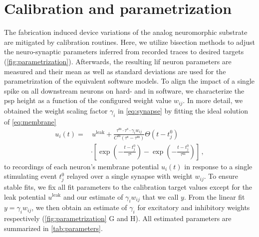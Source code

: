 \section{Calibration and parametrization \label{sec:parametrization}}

The fabrication induced device variations of the analog neuromorphic substrate are mitigated by calibration routines.
Here, we utilize bisection methods to adjust the neuro-synaptic parameters inferred from recorded traces to desired targets (\cref{fig:parametrization}).
Afterwards, the resulting \gls{lif} neuron parameters are measured and their mean as well as standard deviations are used for the parametrization of the equivalent software models.
To align the impact of a single spike on all downstream neurons on hard- and in software, we characterize the \gls{psp} height as a function of the configured weight value $w_{ij}$.
In more detail, we obtained the weight scaling factor $\gamma_i$ in \cref{eq:synapse} by fitting the ideal solution of \cref{eq:membrane}
\begin{align}
	u_i(t) = & \, u^\mathrm{leak} + \frac{\tau^\mathrm{m}\cdot\tau^\mathrm{s}\cdot \gamma_i w_{ij}}{C^\mathrm{m} (\tau^\mathrm{s} - \tau^\mathrm{m})} \Theta\left(t - t_j^0\right) \nonumber\\
	&\cdot\left[\exp{\left(-\frac{t-t_j^0}{\tau^\mathrm{s}}\right)} - \exp{\left(-\frac{t-t_j^0}{\tau^\mathrm{m}}\right)}\right] \, ,
	\label{eq:lif_solution}
\end{align}
to recordings of each neuron's membrane potential $u_i(t)$ in response to a single stimulating event $t_j^0$ relayed over a single synapse with weight $w_{ij}$.
To ensure stable fits, we fix all fit parameters to the calibration target values except for the leak potential $u^\mathrm{leak}$ and our estimate of $\gamma_i w_{ij}$ that we call $y$.
From the linear fit $y = \gamma_i w_{ij}$, we then obtain an estimate of $\gamma_i$ for excitatory and inhibitory weights respectively (\cref{fig:parametrization} G and H).
All estimated parameters are summarized in \cref{tab:parameters}.

\begin{table}[b]
	\centering
	\caption{%
		\textbf{Model parameters.}
		All parameters are given in the equivalent biological time domain.
		The errors indicate the standard deviation.
	}
	\label{tab:parameters}
	
\end{table}


